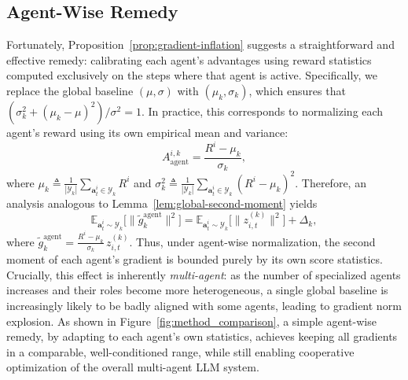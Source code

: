 \subsection{Agent-Wise Remedy}
\label{sec:remedy}
Fortunately, Proposition~\ref{prop:gradient-inflation} suggests a straightforward and effective remedy: calibrating each agent’s advantages using reward statistics computed exclusively on the steps where that agent is active.
Specifically, we replace the global baseline $(\mu,\sigma)$ with $(\mu_k,\sigma_k)$, which ensures that $(\sigma_k^2 + (\mu_k - \mu)^2)/\sigma^2=1$. In practice, this corresponds to normalizing each agent’s reward using its own empirical mean and variance: 
\begin{equation}
    A^{i,k}_{\mathrm{agent}} = \frac{R^i - \mu_k}{\sigma_k},
\end{equation}
where $\mu_k \triangleq \frac{1}{|\mathcal{Y}_k|}\sum_{\bm{a}_t^i\in \mathcal{Y}_k} R^i$ and $\sigma_k^2 \triangleq \frac{1}{|\mathcal{Y}_k|}\sum_{\bm{a}_t^i\in \mathcal{Y}_k} (R^i - \mu_k)^2$. Therefore, an analysis analogous to
Lemma~\ref{lem:global-second-moment} yields
\begin{equation}
    \mathbb{E}_{\bm{a}_t^i\sim \mathcal{Y}_k}\bigl[\|\tilde{g}_k^{\mathrm{agent}}\|^2\bigr]=\mathbb{E}_{\bm{a}_t^i\sim \mathcal{Y}_k}\bigl[\|z_{i,t}^{(k)}\|^2\bigr] +\Delta_k,
\end{equation}
where $\tilde{g}_k^{\mathrm{agent}}=\frac{R^i - \mu_k}{\sigma_k}\, z_{i,t}^{(k)}$. Thus, under agent-wise normalization, the second moment of each agent’s gradient is bounded purely by its own score statistics. Crucially, this effect is inherently \emph{multi-agent}: as the number of specialized agents increases and their roles become more heterogeneous, a single global baseline is increasingly likely to be badly aligned with some agents, leading to gradient norm explosion. As shown in Figure~\ref{fig:method_comparison}, a simple agent-wise remedy, by adapting to each agent’s own statistics, achieves keeping all gradients in a comparable, well-conditioned range, while still enabling cooperative optimization of the overall multi-agent LLM system.

